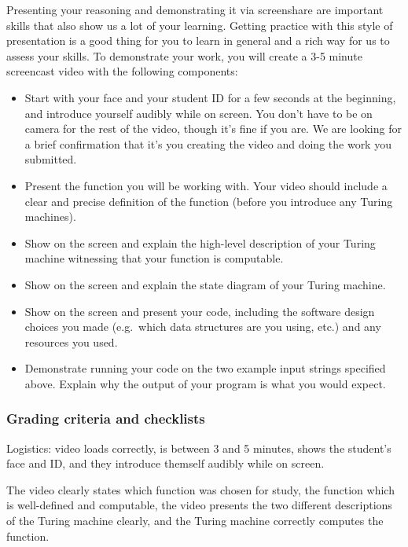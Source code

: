  Presenting your reasoning and demonstrating it via screenshare are important skills that 
 also show us a lot of your learning. Getting practice with this style of presentation is a 
 good thing for you to learn in general and a rich way for us to assess your skills. To demonstrate your work, you will create 
 a 3-5 minute screencast video with the following components:
 \begin{itemize}
	\item Start with your face and your student ID for a 
        few seconds at the beginning, and introduce yourself audibly 
        while on screen. 
	You don't have to be on camera for the rest of the 
        video, though it's fine if you are. 
	We are looking for a brief confirmation that it's 
        you creating the video and 
	doing the work you submitted.
	\item Present the function you will be working with.
	Your video should include a clear and precise definition of the               function (before you introduce any Turing machines).
	\item Show on the screen and explain the high-level description of
        your Turing machine witnessing that your function is computable.
	\item Show on the screen and explain the state diagram of 
        your Turing machine.
	\item Show on the screen and present your code, including
        the software design choices you made (e.g.\ which data structures
        are you using, etc.) and any resources you used.
        \item Demonstrate running your code on the two 
        example input strings specified above. Explain why the output 
        of your program is what you would expect.
\end{itemize}


\subsubsection*{Grading criteria and checklists}

Logistics: video loads correctly, is between 3 and 5 minutes, 
shows the student's face and ID, and they introduce themself 
audibly while on screen.

The video clearly states which function was chosen for study, 
the function which is well-defined and computable, the video
presents the two different descriptions of the Turing machine clearly,
and the Turing machine correctly computes the function.


